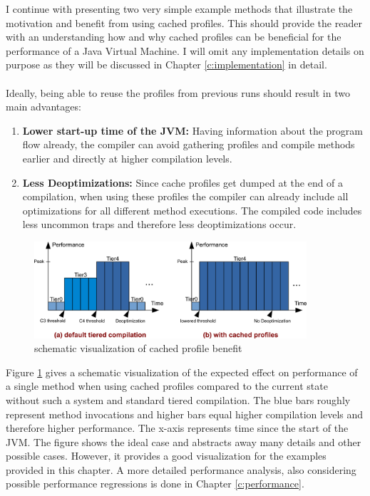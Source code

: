 I continue with presenting two very simple example methods that illustrate the motivation and benefit from using cached profiles.
This should provide the reader with an understanding how and why cached profiles can be beneficial for the performance of a Java Virtual Machine.
I will omit any implementation details on purpose as they will be discussed in Chapter \ref{c:implementation} in detail.
\\\\
Ideally, being able to reuse the profiles from previous runs should result in two main advantages:
\begin{enumerate}
  \item \textbf{Lower start-up time of the JVM:} Having information about the program flow already, the compiler can avoid gathering profiles and compile methods earlier and directly at higher compilation levels.
  \item \textbf{Less Deoptimizations:} Since cache profiles get dumped at the end of a compilation, when using these profiles the compiler can already include all optimizations for all different method executions. The compiled code includes less uncommon traps and therefore less deoptimizations occur.
\end{enumerate}
\begin{figure}[ht]
  \begin{center}
    \centering
    \includegraphics[width=0.9\textwidth]{figures/baseline_vs_usage.png}
    \caption{schematic visualization of cached profile benefit}
    \label{f:baseline_vs_usage}
  \end{center}
\end{figure}
Figure \ref{f:baseline_vs_usage} gives a schematic visualization of the expected effect on performance of a single method when using cached profiles compared to the current state without such a system and standard tiered compilation.
The blue bars roughly represent method invocations and higher bars equal higher compilation levels and therefore higher performance. The x-axis represents time since the start of the JVM. The figure shows the ideal case and abstracts away many details and other possible cases. However, it provides a good visualization for the examples provided in this chapter. A more detailed performance analysis, also considering possible performance regressions is done in Chapter \ref{c:performance}.
